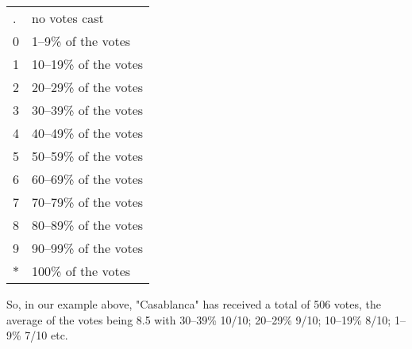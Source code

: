 \begin{tabular}{ll}
. & no votes cast\\        
0 & 1--9\%  of the votes\\
1 & 10--19\% of the votes\\
2 & 20--29\% of the votes\\
3 & 30--39\% of the votes\\
4 & 40--49\% of the votes\\
5 & 50--59\% of the votes\\
6 & 60--69\% of the votes\\
7 & 70--79\% of the votes\\
8 & 80--89\% of the votes\\
9 & 90--99\% of the votes\\
$\ast$ & 100\%   of the votes\\
\end{tabular}

\vspace{4mm}
So, in our example above, "Casablanca" has received a total of 506 votes, the
average of the votes being 8.5 with 30--39\% 10/10; 20--29\% 9/10; 10--19\% 8/10; 
1--9\% 7/10 etc.

       


